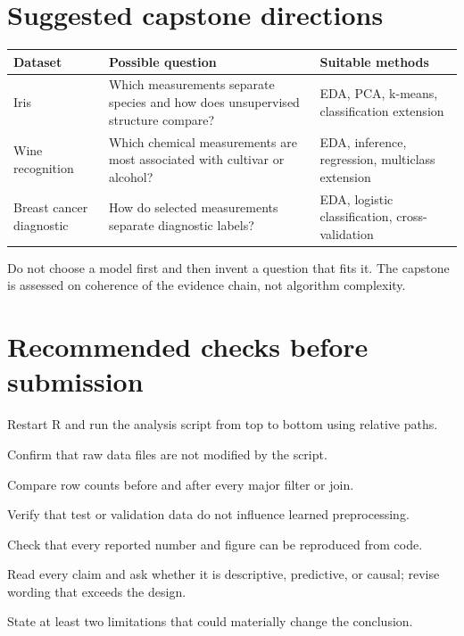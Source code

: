 \section{Suggested capstone directions}
\begin{dstable}
\begin{tabularx}{\linewidth}{@{}D{3.2cm}YD{5.0cm}@{}}
\toprule
{}
\textbf{Dataset} & \textbf{Possible question} & \textbf{Suitable methods} \\
\midrule
Iris & Which measurements separate species and how does unsupervised structure compare? & EDA, PCA, k-means, classification extension \\
Wine recognition & Which chemical measurements are most associated with cultivar or alcohol? & EDA, inference, regression, multiclass extension \\
Breast cancer diagnostic & How do selected measurements separate diagnostic labels? & EDA, logistic classification, cross-validation \\
\bottomrule
\end{tabularx}
\end{dstable}

\begin{pitfall}
Do not choose a model first and then invent a question that fits it. The capstone is assessed on coherence of the evidence chain, not algorithm complexity.
\end{pitfall}


\section{Recommended checks before submission}
\begin{mlsteps}
  \item Restart R and run the analysis script from top to bottom using relative paths.
  \item Confirm that raw data files are not modified by the script.
  \item Compare row counts before and after every major filter or join.
  \item Verify that test or validation data do not influence learned preprocessing.
  \item Check that every reported number and figure can be reproduced from code.
  \item Read every claim and ask whether it is descriptive, predictive, or causal; revise wording that exceeds the design.
  \item State at least two limitations that could materially change the conclusion.
\end{mlsteps}



